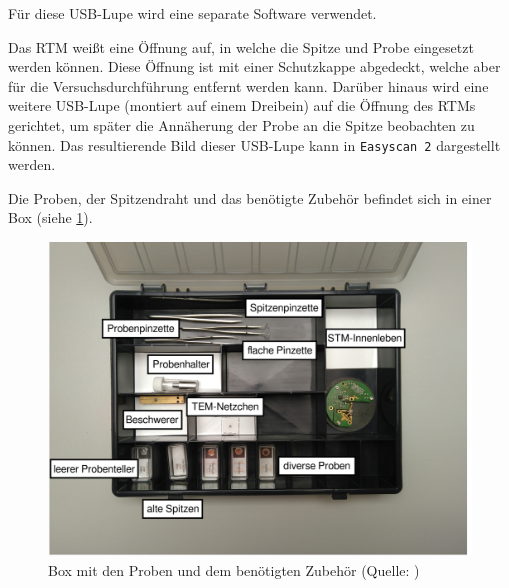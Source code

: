 Für diese USB-Lupe wird eine separate Software verwendet.\par
Das RTM weißt eine Öffnung auf, in welche die Spitze und Probe eingesetzt werden können. Diese Öffnung ist mit einer Schutzkappe abgedeckt, welche aber für
die Versuchsdurchführung entfernt werden kann. Darüber hinaus wird eine weitere USB-Lupe (montiert auf einem Dreibein) auf die Öffnung des RTMs gerichtet,
um später die Annäherung der Probe an die Spitze beobachten zu können. Das resultierende Bild dieser USB-Lupe kann in \texttt{Easyscan 2} dargestellt werden.\par
Die Proben, der Spitzendraht und das benötigte Zubehör befindet sich in einer Box (siehe \cref{fig:koffer}).
\begin{figure}[H]
	\centering
	\includegraphics[width=0.8\linewidth]{../figs/koffer.png}
	\caption{Box mit den Proben und dem benötigten Zubehör (Quelle: \cite{skript})}
	\label{fig:koffer}
\end{figure}
